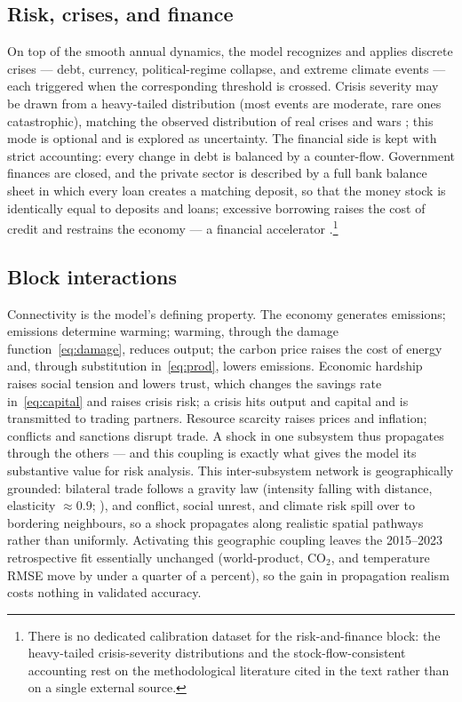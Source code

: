 \documentclass[11pt,a4paper]{article}
\begin{document}
\subsection{Risk, crises, and finance}

On top of the smooth annual dynamics, the model recognizes and applies discrete crises --- debt,
currency, political-regime collapse, and extreme climate events --- each triggered when the
corresponding threshold is crossed. Crisis severity may be drawn from a heavy-tailed distribution
(most events are moderate, rare ones catastrophic), matching the observed distribution of real
crises and wars \citep{taleb2007,weitzman2009}; this mode is optional and is explored as uncertainty.
The financial side is kept with strict accounting: every change in debt is balanced by a
counter-flow. Government finances are closed, and the private sector is described by a full bank
balance sheet in which every loan creates a matching deposit, so that the money stock is identically
equal to deposits and loans; excessive borrowing raises the cost of credit and restrains the economy
--- a financial accelerator \citep{bernanke1999,godley2007}.\footnote{There is no dedicated
calibration dataset for the risk-and-finance block: the heavy-tailed crisis-severity distributions
and the stock-flow-consistent accounting rest on the methodological literature cited in the text
rather than on a single external source.}

\subsection{Block interactions}

Connectivity is the model's defining property. The economy generates emissions; emissions determine
warming; warming, through the damage function~\eqref{eq:damage}, reduces output; the carbon price
raises the cost of energy and, through substitution in~\eqref{eq:prod}, lowers emissions. Economic
hardship raises social tension and lowers trust, which changes the savings rate
in~\eqref{eq:capital} and raises crisis risk; a crisis hits output and capital and is transmitted to
trading partners. Resource scarcity raises prices and inflation; conflicts and sanctions disrupt
trade. A shock in one subsystem thus propagates through the others --- and this coupling is exactly
what gives the model its substantive value for risk analysis. This inter-subsystem network is
geographically grounded: bilateral trade follows a gravity law (intensity falling with distance,
elasticity ${\approx}0.9$; \citealp{headmayer2014}), and conflict, social unrest, and climate risk
spill over to bordering neighbours, so a shock propagates along realistic spatial pathways rather than
uniformly. Activating this geographic coupling leaves the 2015--2023 retrospective fit essentially
unchanged (world-product, $\mathrm{CO_2}$, and temperature RMSE move by under a quarter of a percent),
so the gain in propagation realism costs nothing in validated accuracy.
\end{document}
